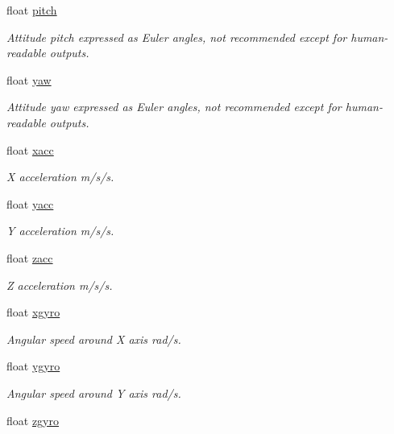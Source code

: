 \begin{DoxyCompactItemize}
float \hyperlink{struct____mavlink__sim__state__t_acec861e9f5f2b6f85150a4c588abcf84}{pitch}
\begin{DoxyCompactList}\small\item\em Attitude pitch expressed as Euler angles, not recommended except for human-\/readable outputs. \end{DoxyCompactList}\item 
float \hyperlink{struct____mavlink__sim__state__t_afeb19c5418ee1b9b5c85d023b6cfc0df}{yaw}
\begin{DoxyCompactList}\small\item\em Attitude yaw expressed as Euler angles, not recommended except for human-\/readable outputs. \end{DoxyCompactList}\item 
float \hyperlink{struct____mavlink__sim__state__t_a9d04a947d145cbdbf3bfc5ca28f65057}{xacc}
\begin{DoxyCompactList}\small\item\em X acceleration m/s/s. \end{DoxyCompactList}\item 
float \hyperlink{struct____mavlink__sim__state__t_aff549378ca9cd4eb5b79a591b40e5dfe}{yacc}
\begin{DoxyCompactList}\small\item\em Y acceleration m/s/s. \end{DoxyCompactList}\item 
float \hyperlink{struct____mavlink__sim__state__t_a9205c7cddd37f729f68695bcbec647f9}{zacc}
\begin{DoxyCompactList}\small\item\em Z acceleration m/s/s. \end{DoxyCompactList}\item 
float \hyperlink{struct____mavlink__sim__state__t_a59c0563e7cad212e45726c8ec8508f4a}{xgyro}
\begin{DoxyCompactList}\small\item\em Angular speed around X axis rad/s. \end{DoxyCompactList}\item 
float \hyperlink{struct____mavlink__sim__state__t_addb404aaa53ea7a5cfc3c8d88be79332}{ygyro}
\begin{DoxyCompactList}\small\item\em Angular speed around Y axis rad/s. \end{DoxyCompactList}\item 
float \hyperlink{struct____mavlink__sim__state__t_acb539dc5d540d5f101f254ffdcc56726}{zgyro}

\end{DoxyCompactItemize}
